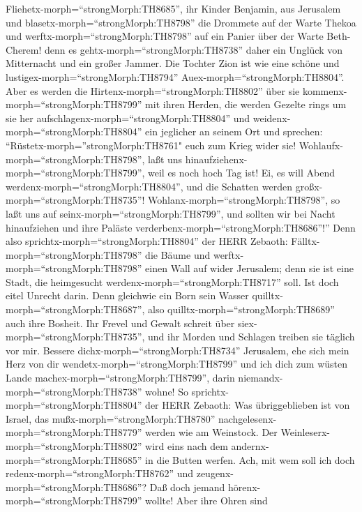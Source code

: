  Fliehetx-morph=``strongMorph:TH8685'', ihr Kinder Benjamin,
aus Jerusalem und blasetx-morph=``strongMorph:TH8798'' die Drommete auf
der Warte Thekoa und werftx-morph=``strongMorph:TH8798'' auf ein Panier
über der Warte Beth-Cherem! denn es gehtx-morph=``strongMorph:TH8738''
daher ein Unglück von Mitternacht und ein großer Jammer. 
Die Tochter Zion ist wie eine schöne und
lustigex-morph=``strongMorph:TH8794'' Auex-morph=``strongMorph:TH8804''.
 Aber es werden die Hirtenx-morph=``strongMorph:TH8802''
über sie kommenx-morph=``strongMorph:TH8799'' mit ihren Herden, die
werden Gezelte rings um sie her
aufschlagenx-morph=``strongMorph:TH8804'' und
weidenx-morph=``strongMorph:TH8804'' ein jeglicher an seinem Ort und
sprechen:  ``Rüstetx-morph=''strongMorph:TH8761" euch zum
Krieg wider sie! Wohlaufx-morph=``strongMorph:TH8798'', laßt uns
hinaufziehenx-morph=``strongMorph:TH8799'', weil es noch hoch Tag ist!
Ei, es will Abend werdenx-morph=``strongMorph:TH8804'', und die Schatten
werden großx-morph=``strongMorph:TH8735''! 
Wohlanx-morph=``strongMorph:TH8798'', so laßt uns auf
seinx-morph=``strongMorph:TH8799'', und sollten wir bei Nacht
hinaufziehen und ihre Paläste verderbenx-morph=``strongMorph:TH8686''!''
 Denn also sprichtx-morph=``strongMorph:TH8804'' der HERR
Zebaoth: Fälltx-morph=``strongMorph:TH8798'' die Bäume und
werftx-morph=``strongMorph:TH8798'' einen Wall auf wider Jerusalem; denn
sie ist eine Stadt, die heimgesucht werdenx-morph=``strongMorph:TH8717''
soll. Ist doch eitel Unrecht darin.  Denn gleichwie ein Born
sein Wasser quilltx-morph=``strongMorph:TH8687'', also
quilltx-morph=``strongMorph:TH8689'' auch ihre Bosheit. Ihr Frevel und
Gewalt schreit über siex-morph=``strongMorph:TH8735'', und ihr Morden
und Schlagen treiben sie täglich vor mir.  Bessere
dichx-morph=``strongMorph:TH8734'' Jerusalem, ehe sich mein Herz von dir
wendetx-morph=``strongMorph:TH8799'' und ich dich zum wüsten Lande
machex-morph=``strongMorph:TH8799'', darin
niemandx-morph=``strongMorph:TH8738'' wohne!  So
sprichtx-morph=``strongMorph:TH8804'' der HERR Zebaoth: Was
übriggeblieben ist von Israel, das mußx-morph=``strongMorph:TH8780''
nachgelesenx-morph=``strongMorph:TH8779'' werden wie am Weinstock. Der
Weinleserx-morph=``strongMorph:TH8802'' wird eins nach dem
andernx-morph=``strongMorph:TH8685'' in die Butten werfen. 
Ach, mit wem soll ich doch redenx-morph=``strongMorph:TH8762'' und
zeugenx-morph=``strongMorph:TH8686''? Daß doch jemand
hörenx-morph=``strongMorph:TH8799'' wollte! Aber ihre Ohren sind
